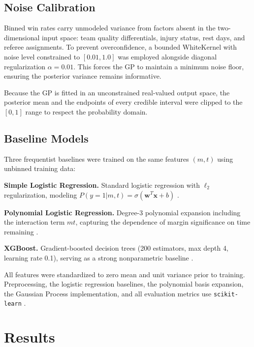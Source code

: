 \documentclass[conference]{IEEEtran}
\begin{document}
\subsection{Noise Calibration}

Binned win rates carry unmodeled variance from factors absent in the two-dimensional input space: team quality differentials, injury status, rest days, and referee assignments. To prevent overconfidence, a bounded WhiteKernel with noise level constrained to $[0.01, 1.0]$ was employed alongside diagonal regularization $\alpha = 0.01$. This forces the GP to maintain a minimum noise floor, ensuring the posterior variance remains informative.

Because the GP is fitted in an unconstrained real-valued output space, the posterior mean and the endpoints of every credible interval were clipped to the $[0, 1]$ range to respect the probability domain.

\subsection{Baseline Models}

Three frequentist baselines were trained on the same features $(m, t)$ using unbinned training data:

\textbf{Simple Logistic Regression.} Standard logistic regression with $\ell_2$ regularization, modeling $P(y\!=\!1 | m, t) = \sigma(\mathbf{w}^T\mathbf{x} + b)$ \cite{pilario2023}.

\textbf{Polynomial Logistic Regression.} Degree-3 polynomial expansion including the interaction term $mt$, capturing the dependence of margin significance on time remaining \cite{pilario2023}.

\textbf{XGBoost.} Gradient-boosted decision trees (200 estimators, max depth 4, learning rate 0.1), serving as a strong nonparametric baseline \cite{chen2016}.

All features were standardized to zero mean and unit variance prior to training. Preprocessing, the logistic regression baselines, the polynomial basis expansion, the Gaussian Process implementation, and all evaluation metrics use \texttt{scikit-learn} \cite{pedregosa2011}.

\section{Results}
\end{document}
